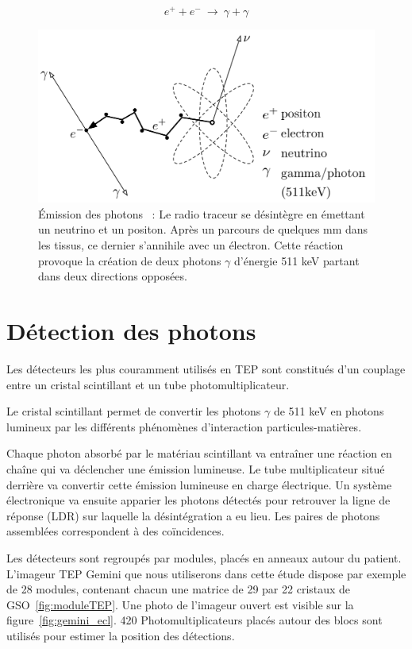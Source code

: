 \begin{equation}
 e^+ + e^-~\rightarrow~\gamma + \gamma
\label{eq:annihilation}
\end{equation}

\begin{figure}
\centering
\includegraphics[width=12cm]{images/annihilation}
\caption[\'Emission des photons]{\'Emission des photons~\cite{Langner2008ad} : Le radio traceur se désintègre en émettant un neutrino et un positon. Après un parcours de quelques mm dans les tissus, ce dernier s'annihile avec un électron. Cette réaction provoque la création de deux photons $\gamma$ d'énergie 511 keV partant dans deux directions opposées.}
\label{fig:Langner2008ad}
\end{figure}

\section{Détection des photons}

Les détecteurs les plus couramment utilisés en TEP sont constitués d'un couplage entre un cristal scintillant et un tube photomultiplicateur.

Le cristal scintillant permet de convertir les photons $\gamma$ de 511 keV en photons lumineux par les différents phénomènes d'interaction particules-matières.

Chaque photon absorbé par le matériau scintillant va entraîner une réaction en chaîne qui va déclencher une émission lumineuse. Le tube multiplicateur situé derrière va convertir cette émission lumineuse en charge électrique. Un système électronique va ensuite apparier les photons détectés pour retrouver la ligne de réponse (LDR) sur laquelle la désintégration a eu lieu. Les paires de photons assemblées correspondent à des coïncidences.

Les détecteurs sont regroupés par modules, placés en anneaux autour du patient. L'imageur TEP Gemini que nous utiliserons dans cette étude dispose par exemple de 28 modules, contenant chacun une matrice de 29 par 22 cristaux de GSO~\ref{fig:moduleTEP}. Une photo de l'imageur ouvert est visible sur la figure~\ref{fig:gemini_ecl}. 420 Photomultiplicateurs placés autour des blocs sont utilisés pour estimer la position des détections.


